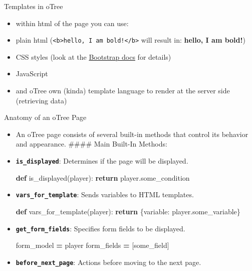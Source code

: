 \documentclass[
  ignorenonframetext,
]{beamer}
\newenvironment{Shaded}{\begin{snugshade}}{\end{snugshade}}
\newcommand{\ControlFlowTok}[1]{\textcolor[rgb]{0.13,0.29,0.53}{\textbf{#1}}}
\newcommand{\KeywordTok}[1]{\textcolor[rgb]{0.13,0.29,0.53}{\textbf{#1}}}
\newcommand{\NormalTok}[1]{#1}
\newcommand{\OperatorTok}[1]{\textcolor[rgb]{0.81,0.36,0.00}{\textbf{#1}}}
\newcommand{\StringTok}[1]{\textcolor[rgb]{0.31,0.60,0.02}{#1}}
\providecommand{\tightlist}{%
  \setlength{\itemsep}{0pt}\setlength{\parskip}{0pt}}
\begin{document}
\begin{frame}[fragile]{Templates in oTree}
\label{templates-in-otree}
\begin{itemize}
\tightlist
\item
  within html of the page you can use:
\item
  plain html
  (\texttt{\textless{}b\textgreater{}hello,\ I\ am\ bold!\textless{}/b\textgreater{}}
  will result in: \textbf{hello, I am bold!})
\item
  CSS styles (look at the \href{https://getbootstrap.com/}{Bootstrap
  docs} for details)
\item
  JavaScript
\item
  and oTree own (kinda) template language to render at the server side
  (retrieving data)
\end{itemize}

\begin{block}{Anatomy of an oTree Page}
\label{anatomy-of-an-otree-page}
\begin{itemize}
\item
  An oTree page consists of several built-in methods that control its
  behavior and appearance. \scriptsize \#\#\#\# Main Built-In Methods:
\item
  \textbf{\texttt{is\_displayed}}: Determines if the page will be
  displayed.

\begin{Shaded}
\begin{Highlighting}[]
\KeywordTok{def}\NormalTok{ is\_displayed(player):}
    \ControlFlowTok{return}\NormalTok{ player.some\_condition}
\end{Highlighting}
\end{Shaded}
\item
  \textbf{\texttt{vars\_for\_template}}: Sends variables to HTML
  templates.

\begin{Shaded}
\begin{Highlighting}[]
\KeywordTok{def}\NormalTok{ vars\_for\_template(player):}
    \ControlFlowTok{return}\NormalTok{ \{}\StringTok{\textquotesingle{}variable\textquotesingle{}}\NormalTok{: player.some\_variable\}}
\end{Highlighting}
\end{Shaded}
\item
  \textbf{\texttt{get\_form\_fields}}: Specifies form fields to be
  displayed.

\begin{Shaded}
\begin{Highlighting}[]
\NormalTok{form\_model }\OperatorTok{=} \StringTok{\textquotesingle{}player\textquotesingle{}}
\NormalTok{form\_fields }\OperatorTok{=}\NormalTok{ [}\StringTok{\textquotesingle{}some\_field\textquotesingle{}}\NormalTok{]}
\end{Highlighting}
\end{Shaded}
\item
  \textbf{\texttt{before\_next\_page}}: Actions before moving to the
  next page.


\end{itemize}
\end{block}
\end{frame}
\end{document}
